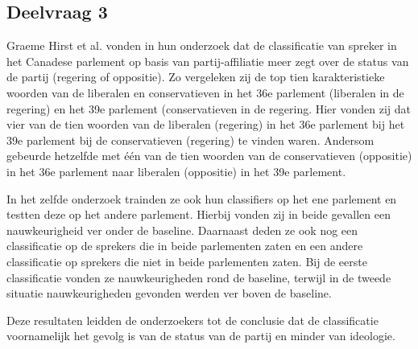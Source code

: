 \subsection{Deelvraag 3}
Graeme Hirst et al. vonden in hun onderzoek dat de classificatie van spreker in het Canadese parlement op basis van partij-affiliatie meer zegt over de status van de partij (regering of oppositie).\cite{Hirst_textto} Zo vergeleken zij de top tien karakteristieke woorden van de liberalen en conservatieven in het 36e parlement (liberalen in de regering) en het 39e parlement (conservatieven in de regering. Hier vonden zij dat vier van de tien woorden van de liberalen (regering) in het 36e parlement bij het 39e parlement bij de conservatieven (regering) te vinden waren. Andersom gebeurde hetzelfde met één van de tien woorden van de conservatieven (oppositie) in het 36e parlement naar liberalen (oppositie) in het 39e parlement.\par
In het zelfde onderzoek trainden ze ook hun classifiers op het ene parlement en testten deze op het andere parlement. Hierbij vonden zij in beide gevallen een nauwkeurigheid ver onder de baseline. Daarnaast deden ze ook nog een classificatie op de sprekers die in beide parlementen zaten en een andere classificatie op sprekers die niet in beide parlementen zaten. Bij de eerste classificatie vonden ze nauwkeurigheden rond de baseline, terwijl in de tweede situatie  nauwkeurigheden gevonden werden ver boven de baseline. \par
Deze resultaten leidden de onderzoekers tot de conclusie dat de classificatie voornamelijk het gevolg is van de status van de partij en minder van ideologie.
